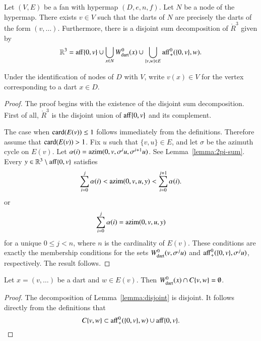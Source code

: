 

\begin{lemma}
Let $(V,E)$ be a fan with hypermap $(D,e,n,f)$.  Let $N$ be a node of the hypermap.  There exists $v\in V$
such that the darts of $N$ are precisely
the darts of the form $(v,\ldots)$.  Furthermore, there is a 
disjoint sum decomposition of $\ring{R}^3$ given by
  $$
  \mathbb{R}^3 = 
  {\operatorname{aff}}\{0,v\} \cup
  \bigcup_{x\in N} W^0_{\text{dart}}(x)  \cup 
  \bigcup_{\{v,w\}\in E} {\operatorname{aff}}_+^0(\{0,v\},w).
  $$
\end{lemma}

\begin{definition}
Under the identification of nodes of $D$ with $V$,
write $v(x)\in V$ for the vertex corresponding to a dart $x\in D$. 
\end{definition}

\begin{proof}
The proof begins with the existence of the disjoint sum decomposition.
First of all, $\ring{R}^3$ is the disjoint union of ${\operatorname{aff}}\{0,v\}$
and its complement.

The case when ${\operatorname{card}}(E(v))\le 1$ follows immediately from the definitions.  
Therefore assume  that ${\operatorname{card}}(E(v)) >1$.
Fix $u$ such that $\{v,u\}\in E$, and let $\sigma$ be the azimuth
cycle on $E(v)$.  Let $\alpha(i)={\operatorname{azim}}(0,v,\sigma^i u,\sigma^{i+1}u)$.   See Lemma~\ref{lemma:2pi-sum}.  Every $y\in\mathbb{R}^3\setminus{\operatorname{aff}}\{0,v\}$ satisfies
$$
\sum_{i=0}^j \alpha(i) <
{\operatorname{azim}}(0,v,u,y) < \sum_{i=0}^{j+1} \alpha(i).
$$
or 
$$
\sum_{i=0}^j \alpha(i) = {\operatorname{azim}}(0,v,u,y)
$$
for a unique $0 \le j < n$, where $n$ is the cardinality of $E(v)$. 
These conditions are exactly the membership conditions for the sets
$
W^0_{\text{dart}}(v,\sigma^j u)
$
and ${\operatorname{aff}}_+^0(\{0,v\},\sigma^j u)$, respectively.
The result follows.
\end{proof}

\begin{corollary}
Let $x = (v,\ldots)$ be a dart and $w\in E(v)$.
Then $W^0_{\text{dart}}(x)\cap C\{v,w\}=\emptyset$.
\end{corollary}

\begin{proof} The decomposition of Lemma~\ref{lemma:disjoint} is
disjoint.  It follows directly from the definitions that
   $$C\{v,w\}\subset {\operatorname{aff}}_+^0(\{0,v\},w) \cup 
    {\operatorname{aff}}\{0,v\}.$$
\end{proof}

